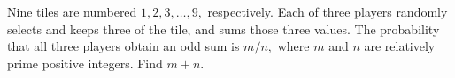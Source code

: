 Nine tiles are numbered $1, 2, 3, \ldots, 9,$ respectively.  Each of three players randomly selects and keeps three of the tile, and sums those three values.  The probability that all three players obtain an odd sum is $m/n,$ where $m$ and $n$ are relatively prime positive integers.  Find $m+n.$
